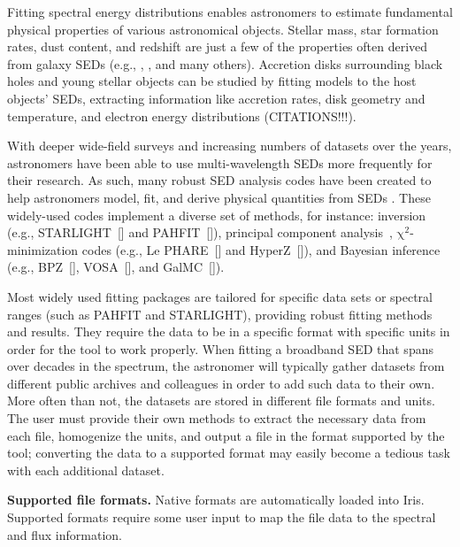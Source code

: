 \documentclass[preprint,authoryear,5p]{elsarticle}
\begin{document}
Fitting spectral energy distributions enables astron\-omers to estimate fundamental
physical properties of various astronomical objects. Stellar mass, star formation rates, 
dust content, and redshift
are just a few of the properties often derived from galaxy SEDs (e.g.\citet{1998AJ....115.1329S},
\citet{2001ApJS..137..139S}, \citet{2007ApJS..169..328R}, and many others). 
Accretion disks surrounding black holes and young stellar objects can be studied by
fitting models to the host objects' SEDs, extracting information like 
accretion rates, disk geometry and temperature, and electron energy distributions
(CITATIONS!!!).

With deeper wide-field surveys and increasing numbers of datasets over the years,
astronomers have been able to use multi-wavelength SEDs more frequently for
their research. As such, many robust SED analysis codes have been created to
help astronomers mod\-el, fit, and derive physical quantities from SEDs
\citep{2011Ap&SS.331....1W,2013ARA&A..51..393C}. These widely-used codes
implement a diverse set of methods, for instance: inversion (e.g., 
STARLIGHT~[\citealp{2004MNRAS.355..273C}] and
PAHFIT~[\citealp{2007ApJ...656..770S}]),
principal component analysis~\citep[e.g.,][]{2009MNRAS.394.1496B},
$\mathrm{\chi}^{2}$-minimization codes 
(e.g., Le PHARE~[\citealp{1999MNRAS.310..540A,2006A&A...457..841I}] and 
HyperZ~[\citealp{2000A&A...363..476B}]), and Bayesian inference 
(e.g., BPZ~[\citealp{2000ApJ...536..571B}], 
VOSA~[\citealp{2008A&A...492..277B}], and 
GalMC~[\citealp{2011ApJ...737...47A}]).

Most widely used fitting packages are tailored for specific data sets or
spectral ranges (such as PAHFIT and STAR\-LIGHT), providing robust
fitting methods and results. They require the data to be in a specific format
with specific units in order for the tool to work properly. When fitting a
broadband SED that spans over decades in the spectrum, the astronomer will
typically gather datasets from different public archives and colleagues in order
to add such data to their own. More often than not, the datasets are stored in
different file formats and units. 
The user must provide their own methods to extract the necessary data from each
file, homogenize the units, and output a file in the format supported by the
tool; converting the data to a supported format may easily become a tedious task
with each additional dataset.

\begin{table}[tp!]
\caption{\textbf{Supported file formats.} Native formats are automatically loaded into
Iris. Supported formats require some user input to map the file data to the spectral
and flux information.}
\label{table:file_formats}

\end{table}
\end{document}
